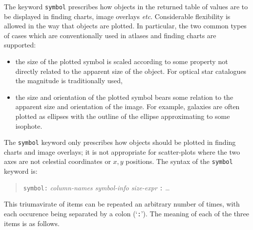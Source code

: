 \documentclass[twoside,11pt]{article}
\renewcommand{\_}{\texttt{\symbol{95}}}
\begin{document}
The keyword {\tt symbol} prescribes how objects in the returned table
of values are to be displayed in finding charts, image overlays \emph{etc}.
Considerable flexibility is allowed in the way that objects are plotted.
In particular, the two common types of cases which are conventionally used
in atlases and finding charts are supported:

\begin{itemize}

  \item the size of the plotted symbol is scaled according to some
   property not directly related to the apparent size of the object.
   For optical star catalogues the magnitude is traditionally used,

  \item the size and orientation of the plotted symbol bears some
   relation to the apparent size and orientation of the image.  For
   example, galaxies are often plotted as ellipses with the outline of
   the ellipse approximating to some isophote.

\end{itemize}

The {\tt symbol} keyword only prescribes how objects should be plotted
in finding charts and image overlays; it is not appropriate for
scatter-plots where the two axes are not celestial coordinates or $x,y$\/
positions.  The syntax of the {\tt symbol} keyword is:

\begin{quote}
{\tt symbol:} {\it column-names symbol-info size-expr}\/ {\tt :} \ldots
\end{quote}

This triumavirate of items can be repeated an arbitrary number of times,
with each occurence being separated by a colon (`{\tt :}').  The meaning
of each of the three items is as follows.
\end{document}
